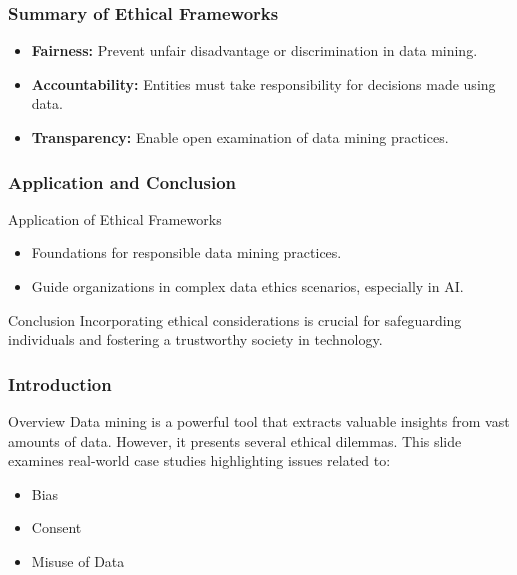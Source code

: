 \documentclass[aspectratio=169]{beamer}
\begin{document}
\begin{frame}[fragile]
    \frametitle{Summary of Ethical Frameworks}
    \begin{itemize}
        \item \textbf{Fairness:} Prevent unfair disadvantage or discrimination in data mining.
        \item \textbf{Accountability:} Entities must take responsibility for decisions made using data.
        \item \textbf{Transparency:} Enable open examination of data mining practices.
    \end{itemize}
\end{frame}

\begin{frame}[fragile]
    \frametitle{Application and Conclusion}
    \begin{block}{Application of Ethical Frameworks}
        \begin{itemize}
            \item Foundations for responsible data mining practices.
            \item Guide organizations in complex data ethics scenarios, especially in AI.
        \end{itemize}
    \end{block}
    
    \begin{block}{Conclusion}
        Incorporating ethical considerations is crucial for safeguarding individuals and fostering a trustworthy society in technology.
    \end{block}
\end{frame}

\begin{frame}[fragile]
    \frametitle{Introduction}
    \begin{block}{Overview}
        Data mining is a powerful tool that extracts valuable insights from vast amounts of data. However, it presents several ethical dilemmas. 
        This slide examines real-world case studies highlighting issues related to:
        \begin{itemize}
            \item Bias
            \item Consent
            \item Misuse of Data
        \end{itemize}
    \end{block}
\end{frame}
\end{document}
